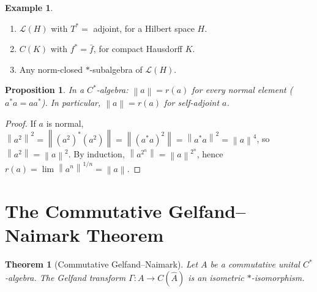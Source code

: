 \documentclass[a4paper,12pt]{book}
\newcommand{\norm}[1]{\left\| #1 \right\|}
\theoremstyle{definition}
\newtheorem{example}[definition]{Example}
\theoremstyle{plain}
\newtheorem{theorem}[definition]{Theorem}
\newtheorem{proposition}[definition]{Proposition}
\theoremstyle{remark}
\begin{document}
\begin{example}\label{ex:cstar-examples}
\begin{enumerate}[label=(\alph*)]
  \item $\mathcal{L}(H)$ with $T^* = $ adjoint, for a Hilbert space $H$.
  \item $C(K)$ with $f^* = \bar{f}$, for compact Hausdorff $K$.
  \item Any norm-closed $*$-subalgebra of $\mathcal{L}(H)$.
\end{enumerate}
\end{example}

\begin{proposition}\label{prop:cstar-spectral-radius}
In a $C^*$-algebra: $\norm{a} = r(a)$ for every normal element ($a^*a = aa^*$).
In particular, $\norm{a} = r(a)$ for self-adjoint $a$.
\end{proposition}

\begin{proof}
If $a$ is normal, $\norm{a^2}^2 = \norm{(a^2)^*(a^2)} = \norm{(a^*a)^2}
= \norm{a^*a}^2 = \norm{a}^4$, so $\norm{a^2} = \norm{a}^2$.
By induction, $\norm{a^{2^n}} = \norm{a}^{2^n}$, hence
$r(a) = \lim \norm{a^n}^{1/n} = \norm{a}$.
\end{proof}

\section{The Commutative Gelfand--Naimark Theorem}\label{sec:gelfand-naimark}


\begin{theorem}[Commutative Gelfand--Naimark]\label{thm:gelfand-naimark}
Let $A$ be a commutative unital $C^*$-algebra. The Gelfand transform
$\Gamma \colon A \to C(\hat{A})$ is an isometric $*$-isomorphism.
\end{theorem}
\end{document}
